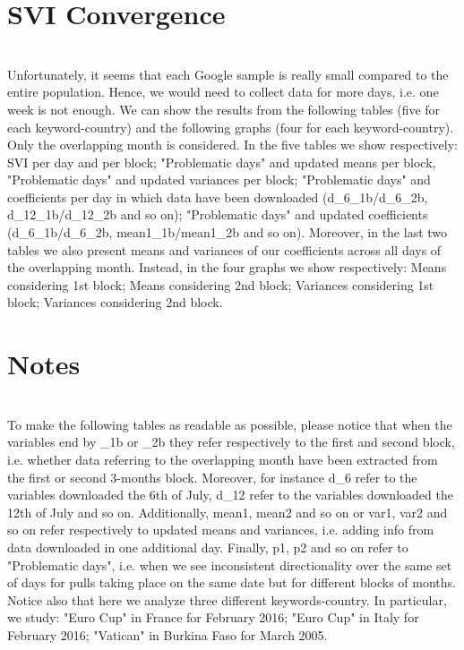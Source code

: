 \documentclass[a4paper,12pt]{article}
\begin{document}
\section{SVI Convergence}
\\Unfortunately, it seems that each Google sample is really small compared to the entire population. Hence, we would need to collect data for more days, i.e. one week is not enough. We can show the results from the following tables (five for each keyword-country) and the following graphs (four for each keyword-country). Only the overlapping month is considered. In the five tables we show respectively: SVI per day and per block; "Problematic days" and updated means per block, "Problematic days" and updated variances per block; "Problematic days" and coefficients per day in which data have been downloaded (d\_6\_1b/d\_6\_2b, d\_12\_1b/d\_12\_2b  and so on); "Problematic days" and updated coefficients (d\_6\_1b/d\_6\_2b, mean1\_1b/mean1\_2b  and so on). Moreover, in the last two tables we also present means and variances of our coefficients across all days of the overlapping month. Instead, in the four graphs we show respectively: Means considering 1st block; Means considering 2nd block; Variances considering 1st block; Variances considering 2nd block.

\section{Notes}
\\To make the following tables as readable as possible, please notice that when the variables end by \_1b or \_2b they refer respectively to the first and second block, i.e. whether data referring to the overlapping month have been extracted from the first or second 3-months block. Moreover, for instance d\_6 refer to the variables downloaded the 6th of July, d\_12 refer to the variables downloaded the 12th of July and so on. Additionally, mean1, mean2 and so on or var1, var2 and so on refer respectively to updated means and variances, i.e. adding info from data downloaded in one additional day. Finally, p1, p2 and so on refer to "Problematic days", i.e. when we see inconsistent directionality over the same set of days for pulls taking place on the same date but for different blocks of months.
\\Notice also that here we analyze three different keywords-country. In particular, we study: "Euro Cup" in France for February 2016; "Euro Cup" in Italy for February 2016; "Vatican" in Burkina Faso for March 2005.
\end{document}
